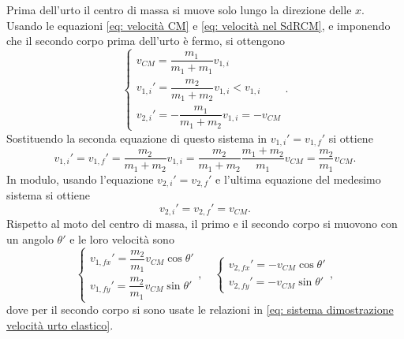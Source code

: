 Prima dell'urto il centro di massa si muove solo lungo la direzione delle $x$. Usando le equazioni \eqref{eq: velocità CM} e \eqref{eq: velocità nel SdRCM}, e imponendo che il secondo corpo prima dell'urto è fermo, si ottengono
\begin{equation}
    \begin{cases}
        v_{CM}=\dfrac{m_1}{m_1+m_1}v_{1,i} \\[1.5ex]
        v_{1,i}'=\dfrac{m_2}{m_1+m_2}v_{1,i}<v_{1,i} \\[1.5ex]
        v_{2,i}'=-\dfrac{m_1}{m_1+m_2}v_{1,i}=-v_{CM}
    \end{cases}.
\end{equation}
Sostituendo la seconda equazione di questo sistema in $v_{1,i}'=v_{1,f}'$ si ottiene
\begin{equation}
    v_{1,i}'=v_{1,f}'=\dfrac{m_2}{m_1+m_2}v_{1,i}=\dfrac{m_2}{m_1+m_2}\dfrac{m_1+m_2}{m_1}v_{CM}=\frac{m_2}{m_1}v_{CM}.
\end{equation}
In modulo, usando l'equazione $v_{2,i}'=v_{2,f}'$ e l'ultima equazione del medesimo sistema si ottiene
\begin{equation}
    v_{2,i}'=v_{2,f}'=v_{CM}.
\end{equation}
Rispetto al moto del centro di massa, il primo e il secondo corpo si muovono con un angolo $\theta'$ e le loro velocità sono
\begin{equation}
    \begin{cases}
        v_{1,fx}'=\dfrac{m_2}{m_1}v_{CM}\cos{\theta'} \\[1.5ex]
        v_{1,fy}'=\dfrac{m_2}{m_1}v_{CM}\sin{\theta'}
    \end{cases},\quad
    \begin{cases}
        v_{2,fx}'=-v_{CM}\cos{\theta'} \\
        v_{2,fy}'=-v_{CM}\sin{\theta'}
    \end{cases},
\end{equation}
dove per il secondo corpo si sono usate le relazioni in \eqref{eq: sistema dimostrazione velocità urto elastico}. 

